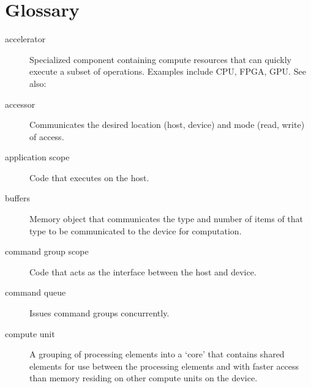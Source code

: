 \documentclass[letterpaper,10pt,english]{sphinxmanual}
\begin{document}
\chapter{Glossary}
\label{\detokenize{glossary:glossary}}\label{\detokenize{glossary:id1}}\label{\detokenize{glossary::doc}}\begin{description}
\item[{accelerator\label{\detokenize{glossary:term-accelerator}}}] \leavevmode
Specialized component containing compute resources that can quickly
execute a subset of operations. Examples include CPU, FPGA, GPU. See
also: {\hyperref[\detokenize{glossary:term-device}]{}}

\item[{accessor\label{\detokenize{glossary:term-accessor}}}] \leavevmode
Communicates the desired location (host, device) and mode (read,
write) of access.

\item[{application scope\label{\detokenize{glossary:term-application-scope}}}] \leavevmode
Code that executes on the host.

\item[{buffers\label{\detokenize{glossary:term-buffers}}}] \leavevmode
Memory object that communicates the type and number of items of that
type to be communicated to the device for computation.

\item[{command group scope\label{\detokenize{glossary:term-command-group-scope}}}] \leavevmode
Code that acts as the interface between the host and device.

\item[{command queue\label{\detokenize{glossary:term-command-queue}}}] \leavevmode
Issues command groups concurrently.

\item[{compute unit\label{\detokenize{glossary:term-compute-unit}}}] \leavevmode
A grouping of processing elements into a ‘core’ that contains shared
elements for use between the processing elements and with faster
access than memory residing on other compute units on the device.


\end{description}
\end{document}
